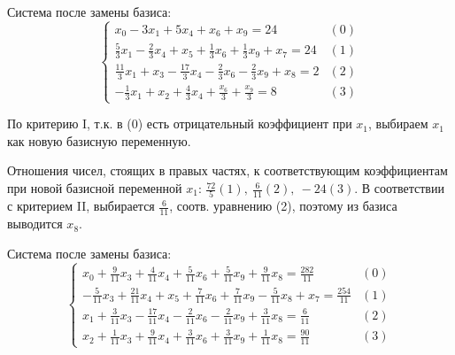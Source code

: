 \documentclass[a4paper,12pt]{article}
\begin{document}
\begin{flushleft}
\begin{enumerate}
    Система после замены базиса:
    \begin{equation*}
      \begin{cases}
        x_0 - 3x_1 + 5x_4 + x_6 + x_9 = 24 & (0)\\
        \frac{5}{3}x_1 - \frac{2}{3}x_4 + x_5 + \frac{1}{3}x_6 + \frac{1}{3}x_9 + x_7 = 24 & (1) \\
        \frac{11}{3}x_1 + x_3 - \frac{17}{3}x_4 - \frac{2}{3}x_6 - \frac{2}{3}x_9 + x_8 = 2 & (2) \\
        -\frac{1}{3}x_1 + x_2 + \frac{4}{3}x_4 + \frac{x_6}{3} + \frac{x_9}{3} = 8 & (3)  
      \end{cases}
    \end{equation*}

    По критерию I, т.к. в (0) есть отрицательный коэффициент при $x_1$, выбираем $x_1$ как новую базисную переменную.

    Отношения чисел, стоящих в правых частях, к соответствующим коэффициентам при новой базисной переменной $x_1$: $\frac{72}{5} (1),~\frac{6}{11}(2),~-24(3)$. В соответствии с критерием II, выбирается $\frac{6}{11}$, соотв. уравнению (2), поэтому из базиса выводится $x_8$.

    Система после замены базиса:
    \begin{equation*}
      \begin{cases}
        x_0 + \frac{9}{11}x_3 + \frac{4}{11}x_4 + \frac{5}{11}x_6 + \frac{5}{11}x_9 + \frac{9}{11}x_8 = \frac{282}{11} & (0) \\
        -\frac{5}{11}x_3 + \frac{21}{11}x_4 + x_5 + \frac{7}{11}x_6 + \frac{7}{11}x_9 - \frac{5}{11}x_8 + x_7 = \frac{254}{11} & (1) \\
        x_1 + \frac{3}{11}x_3 -\frac{17}{11}x_4 -\frac{2}{11}x_6 -\frac{2}{11}x_9 + \frac{3}{11}x_8 = \frac{6}{11} & (2) \\
        x_2 + \frac{1}{11}x_3 + \frac{9}{11}x_4 + \frac{3}{11}x_6 + \frac{3}{11}x_9 + \frac{1}{11}x_8 = \frac{90}{11} & (3)
      \end{cases}
    \end{equation*}


\end{enumerate}
\end{flushleft}
\end{document}
